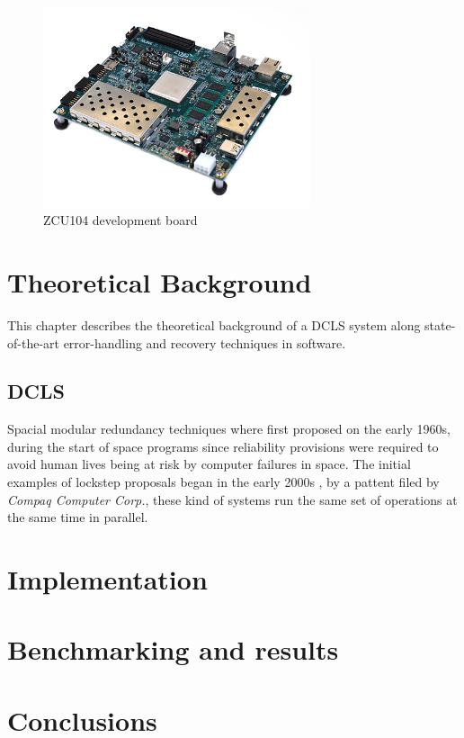 \documentclass[10pt, a4paper]{report}
\begin{document}
\begin{figure}[h!]
    \begin{center}
        \includegraphics[width=0.7\textwidth]{zcu104.jpg}
        \caption{ZCU104 development board}
        \label{zcu104}
    \end{center}
\end{figure}


\chapter{Theoretical Background}
\thispagestyle{fancy}

This chapter describes the theoretical background of a \acrshort{DCLS} system
along state-of-the-art error-handling and recovery techniques in software.

\section{\acrfull{DCLS}}

Spacial modular redundancy techniques where first proposed on the early 1960s,
during the start of space programs since reliability provisions were required to
avoid human lives being at risk by computer failures in space. The initial
examples of lockstep proposals began in the early 2000s \cite{lockstep_patent},
by a pattent filed by \emph{Compaq Computer Corp.}, these kind of systems run
the same set of operations at the same time in parallel. 
 
\chapter{Implementation}
\thispagestyle{fancy}

\chapter{Benchmarking and results}
\thispagestyle{fancy}

\chapter{Conclusions}
\thispagestyle{fancy}

\begin{printbibliography}
    \thispagestyle{fancy}
\end{printbibliography}

\begin{printnoidxglossaries}
    \thispagestyle{fancy}
\end{printnoidxglossaries}
\end{document}
